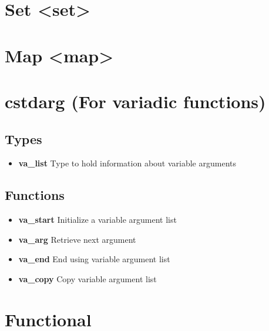 \documentclass{report}
\begin{document}
    \pagebreak \bigbreak \noindent 
    \section{\LARGE Set <set>}
    \bigbreak \noindent 

    \pagebreak \bigbreak \noindent 
    \section{\LARGE Map <map>}
    \bigbreak \noindent 

    \pagebreak \bigbreak \noindent 
    \section{\LARGE cstdarg (For variadic functions)}
    \bigbreak \noindent 
    \subsection{Types}
    \begin{itemize}
        \item \textbf{va\_list} Type to hold information about variable arguments 
    \end{itemize}
    \bigbreak \noindent 
    \subsection{Functions}
    \begin{itemize}
        \item \textbf{va\_start}	Initialize a variable argument list 
        \item \textbf{va\_arg} Retrieve next argument 
        \item \textbf{va\_end} End using variable argument list 
        \item \textbf{va\_copy} Copy variable argument list 
    \end{itemize}

    \pagebreak \bigbreak \noindent 
    \section{\LARGE Functional}
    \bigbreak \noindent 
\end{document}
